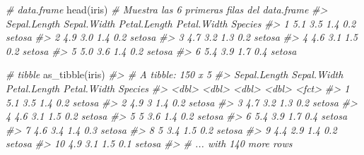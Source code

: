 \documentclass[
]{book}
\newenvironment{Shaded}{\begin{snugshade}}{\end{snugshade}}
\newcommand{\CommentTok}[1]{\textcolor[rgb]{0.56,0.35,0.01}{\textit{#1}}}
\newcommand{\FunctionTok}[1]{\textcolor[rgb]{0.00,0.00,0.00}{#1}}
\newcommand{\NormalTok}[1]{#1}
\begin{document}
\begin{Shaded}
\begin{Highlighting}[]
\CommentTok{\# data.frame}
\FunctionTok{head}\NormalTok{(iris) }\CommentTok{\# Muestra las 6 primeras filas del data.frame}
\CommentTok{\#\textgreater{}   Sepal.Length Sepal.Width Petal.Length Petal.Width Species}
\CommentTok{\#\textgreater{} 1          5.1         3.5          1.4         0.2  setosa}
\CommentTok{\#\textgreater{} 2          4.9         3.0          1.4         0.2  setosa}
\CommentTok{\#\textgreater{} 3          4.7         3.2          1.3         0.2  setosa}
\CommentTok{\#\textgreater{} 4          4.6         3.1          1.5         0.2  setosa}
\CommentTok{\#\textgreater{} 5          5.0         3.6          1.4         0.2  setosa}
\CommentTok{\#\textgreater{} 6          5.4         3.9          1.7         0.4  setosa}
\end{Highlighting}
\end{Shaded}

\begin{Shaded}
\begin{Highlighting}[]
\CommentTok{\# tibble}
\FunctionTok{as\_tibble}\NormalTok{(iris)}
\CommentTok{\#\textgreater{} \# A tibble: 150 x 5}
\CommentTok{\#\textgreater{}    Sepal.Length Sepal.Width Petal.Length Petal.Width Species}
\CommentTok{\#\textgreater{}           \textless{}dbl\textgreater{}       \textless{}dbl\textgreater{}        \textless{}dbl\textgreater{}       \textless{}dbl\textgreater{} \textless{}fct\textgreater{}  }
\CommentTok{\#\textgreater{}  1          5.1         3.5          1.4         0.2 setosa }
\CommentTok{\#\textgreater{}  2          4.9         3            1.4         0.2 setosa }
\CommentTok{\#\textgreater{}  3          4.7         3.2          1.3         0.2 setosa }
\CommentTok{\#\textgreater{}  4          4.6         3.1          1.5         0.2 setosa }
\CommentTok{\#\textgreater{}  5          5           3.6          1.4         0.2 setosa }
\CommentTok{\#\textgreater{}  6          5.4         3.9          1.7         0.4 setosa }
\CommentTok{\#\textgreater{}  7          4.6         3.4          1.4         0.3 setosa }
\CommentTok{\#\textgreater{}  8          5           3.4          1.5         0.2 setosa }
\CommentTok{\#\textgreater{}  9          4.4         2.9          1.4         0.2 setosa }
\CommentTok{\#\textgreater{} 10          4.9         3.1          1.5         0.1 setosa }
\CommentTok{\#\textgreater{} \# ... with 140 more rows}
\end{Highlighting}
\end{Shaded}
\end{document}
